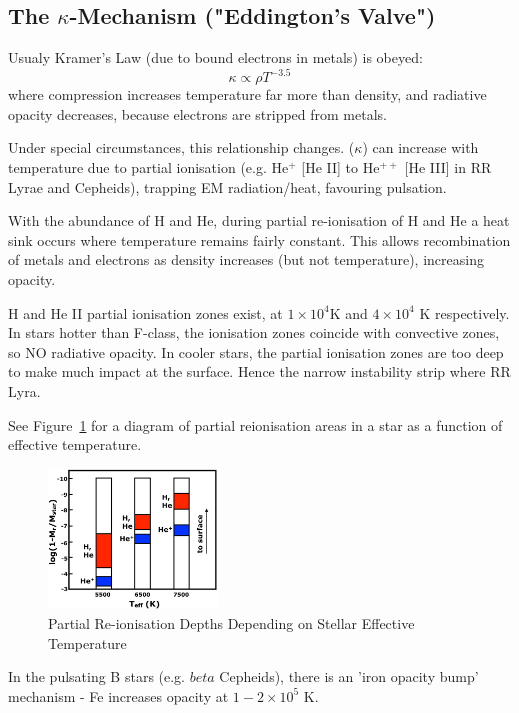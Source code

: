 \documentclass{spy}
\begin{document}
\subsection{The \(\kappa\)-Mechanism ("Eddington's Valve")}
Usualy Kramer's Law (due to bound electrons in metals) is obeyed:
\begin{equation}
    \kappa \propto \rho T^{-3.5}
\end{equation}
where compression increases temperature far more than density, and radiative opacity decreases, because electrons are stripped from metals. 

Under special circumstances, this relationship changes. (\(\kappa\)) can increase with temperature due to partial ionisation (e.g. He\(^+\) [He II] to He\(^{++}\) [He III] in RR Lyrae and Cepheids), trapping EM radiation/heat, favouring pulsation.  

With the abundance of H and He, during partial re-ionisation of H and He a heat sink occurs where temperature remains fairly constant. This allows recombination of metals and electrons as density increases (but not temperature), increasing opacity. 

H and He II partial ionisation zones exist, at \(1 \times 10^4\)K and \(4 \times 10^4\) K respectively. In stars hotter than F-class, the ionisation zones coincide with convective zones, so NO radiative opacity. In cooler stars, the partial ionisation zones are too deep to make much impact at the surface. Hence the narrow instability strip where RR Lyra.

See Figure~\ref{ionisation_temp_diagram} for a diagram of partial reionisation areas in a star as a function of effective temperature. 

\begin{figure}[h]
    \centering
    \includegraphics[width=0.4\textwidth]{ionisation_temp.eps}
    \caption{Partial Re-ionisation Depths Depending on Stellar Effective Temperature} 
    \label{ionisation_temp_diagram}
\end{figure}

In the pulsating B stars (e.g. \(beta\) Cepheids), there is an 'iron opacity bump' mechanism - Fe increases opacity at \(1-2 \times 10^5\) K. 
\end{document}
